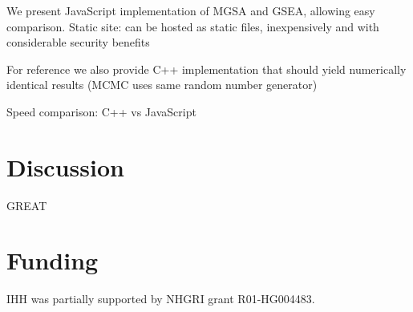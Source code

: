 We present JavaScript implementation of MGSA and GSEA, allowing easy comparison.
Static site: can be hosted as static files, inexpensively and with considerable security benefits

For reference we also provide C++ implementation that should yield numerically identical results
(MCMC uses same random number generator)

Speed comparison: C++ vs JavaScript

\section*{Discussion}

GREAT \cite{pmid20436461}

\section*{Funding}

IHH was partially supported by NHGRI grant R01-HG004483.


%
%
%
%
%
%
%
%



